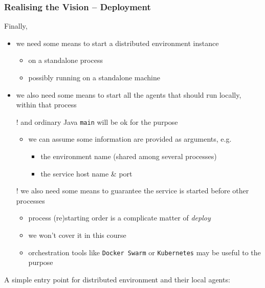 \documentclass[presentation]{beamer}\mode<presentation>{\usetheme{AMSCesenaPurpleAndGold}}
\begin{document}
\begin{frame}[allowframebreaks]
	\frametitle{Realising the Vision -- Deployment}

	Finally,
	\medskip
	\begin{itemize}
		\item we need some means to \alert{start} a distributed environment instance
		\begin{itemize}
			\item on a standalone \alert{process}
			\item possibly running on a standalone \alert{machine}
		\end{itemize}

		\medskip

		\item we also need some means to start all the agents that should run locally, within that process
		
		\medskip

		\item[!] and ordinary Java \texttt{main} will be ok for the purpose
		\begin{itemize}
			\item we can assume some information are provided as arguments, e.g.
			\begin{itemize}
				\item the environment name (shared among several processes)
				\item the \linda{} service host name \& port
			\end{itemize}
		\end{itemize}
		
		\framebreak

		\item[!] we also need some means to guarantee the service is started \alert{before} other processes
		\begin{itemize}
			\item process (re)starting order is a complicate matter of \emph{deploy}
			\item we won't cover it in this course
			\item \alert{orchestration} tools like \texttt{Docker Swarm} or \texttt{Kubernetes} may be useful to the purpose
		\end{itemize} 

	\end{itemize}

	\framebreak

	A simple entry point for distributed environment and their local agents:
	


\end{frame}
\end{document}
